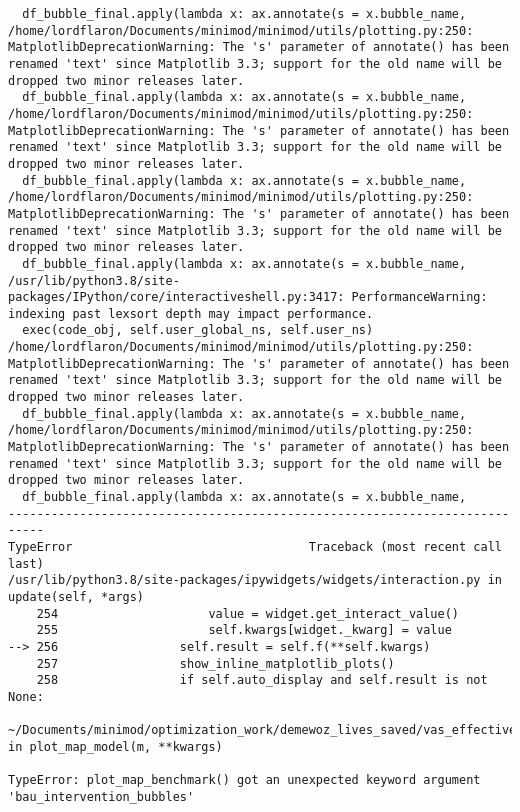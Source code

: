 \documentclass[
]{article}
\begin{document}
\begin{verbatim}
  df_bubble_final.apply(lambda x: ax.annotate(s = x.bubble_name,
/home/lordflaron/Documents/minimod/minimod/utils/plotting.py:250: MatplotlibDeprecationWarning: The 's' parameter of annotate() has been renamed 'text' since Matplotlib 3.3; support for the old name will be dropped two minor releases later.
  df_bubble_final.apply(lambda x: ax.annotate(s = x.bubble_name,
/home/lordflaron/Documents/minimod/minimod/utils/plotting.py:250: MatplotlibDeprecationWarning: The 's' parameter of annotate() has been renamed 'text' since Matplotlib 3.3; support for the old name will be dropped two minor releases later.
  df_bubble_final.apply(lambda x: ax.annotate(s = x.bubble_name,
/home/lordflaron/Documents/minimod/minimod/utils/plotting.py:250: MatplotlibDeprecationWarning: The 's' parameter of annotate() has been renamed 'text' since Matplotlib 3.3; support for the old name will be dropped two minor releases later.
  df_bubble_final.apply(lambda x: ax.annotate(s = x.bubble_name,
/usr/lib/python3.8/site-packages/IPython/core/interactiveshell.py:3417: PerformanceWarning: indexing past lexsort depth may impact performance.
  exec(code_obj, self.user_global_ns, self.user_ns)
/home/lordflaron/Documents/minimod/minimod/utils/plotting.py:250: MatplotlibDeprecationWarning: The 's' parameter of annotate() has been renamed 'text' since Matplotlib 3.3; support for the old name will be dropped two minor releases later.
  df_bubble_final.apply(lambda x: ax.annotate(s = x.bubble_name,
/home/lordflaron/Documents/minimod/minimod/utils/plotting.py:250: MatplotlibDeprecationWarning: The 's' parameter of annotate() has been renamed 'text' since Matplotlib 3.3; support for the old name will be dropped two minor releases later.
  df_bubble_final.apply(lambda x: ax.annotate(s = x.bubble_name,
---------------------------------------------------------------------------
TypeError                                 Traceback (most recent call last)
/usr/lib/python3.8/site-packages/ipywidgets/widgets/interaction.py in update(self, *args)
    254                     value = widget.get_interact_value()
    255                     self.kwargs[widget._kwarg] = value
--> 256                 self.result = self.f(**self.kwargs)
    257                 show_inline_matplotlib_plots()
    258                 if self.auto_display and self.result is not None:

~/Documents/minimod/optimization_work/demewoz_lives_saved/vas_effective_coverage_analysis.ipynb in plot_map_model(m, **kwargs)

TypeError: plot_map_benchmark() got an unexpected keyword argument 'bau_intervention_bubbles'
\end{verbatim}
\end{document}
